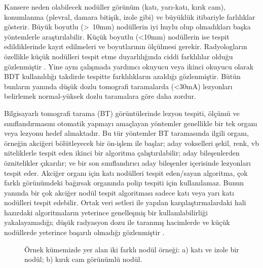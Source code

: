 \documentclass[conference]{IEEEtran}
\begin{document}
Kansere neden olabilecek nodüller görünüm (katı, yarı-katı, kırık cam), konumlanma (plevral, damara bitişik, izole gibi) ve büyüklük itibariyle farlılıklar gösterir. Büyük boyutlu (>~10mm) nodüllerin iyi huylu olup olmadıkları başka yöntemlerle araştırılabilir. Küçük boyutlu (<10mm) nodüllerin ise tespit edildiklerinde kayıt edilmeleri ve boyutlarının ölçülmesi gerekir. Radyologların özellikle küçük nodülleri tespit etme duyarlılığında ciddi farklılılar olduğu gözlenmiştir \cite{rubin2015}. Yine aynı çalışmada yardımcı okuyucu veya ikinci okuyucu olarak BDT kullanıldığı takdirde tespitte farklılıkların azaldığı gözlenmiştir. Bütün bunların yanında düşük dozlu tomografi taramalarda (<30mA) lezyonları belirlemek normal-yüksek dozlu taramalara göre daha zordur.

Bilgisayarlı tomografi tarama (BT) görüntülerinde lezyon tespiti, ölçümü ve sınıflandırmasını otomatik yapmayı amaçlayan yöntemler genellikle bir tek organı veya lezyonu hedef almaktadır. Bu tür yöntemler BT taramasında ilgili organı, örneğin akciğeri bölütleyecek bir ön-işlem ile başlar; aday vokselleri şekil, renk, vb niteliklerle tespit eden ikinci bir algoritma çalıştırılabilir; aday bileşenlerden öznitelikler çıkarılır; ve bir son sınıflandırıcı aday bileşenler içerisinde lezyonları tespit eder. Akciğer organı için katı nodülleri tespit eden/sayan algoritma, çok farklı görünümdeki bağırsak organında polip tespiti için kullanılamaz. Bunun yanında bir çok akciğer nodül tespit algoritması sadece katı veya yarı katı nodülleri tespit edebilir. Ortak veri setleri ile yapılan karşılaştırmalardaki hali hazırdaki algoritmaların yeterince genelleşmiş bir kullanılabilirliği yakalayamadığı; düşük radyasyon dozu ile taranmış hacimlerde ve küçük nodüllerde yeterince başarılı olmadığı gözlenmiştir \cite{anode09}. 

\begin{figure}
\centering
{}
\caption{Örnek kümemizde yer alan iki farklı nodül örneği: a) katı ve izole bir nodül; b) kırık cam görünümlü nodül.}
\label{fig0}
\end{figure}
\end{document}
